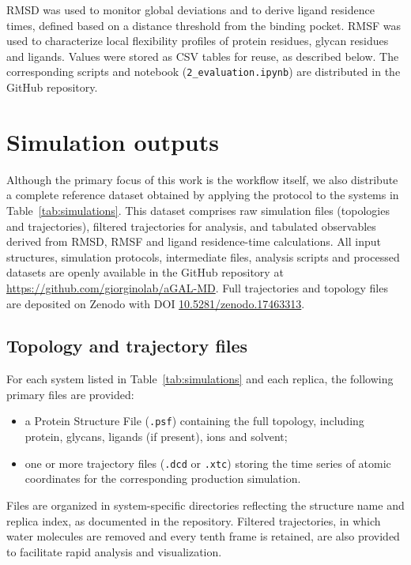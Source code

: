 \documentclass{article}
\begin{document}
RMSD was used to monitor global deviations and to derive ligand residence times, defined based on a distance threshold from the binding pocket.
RMSF was used to characterize local flexibility profiles of protein residues, glycan residues and ligands.
Values were stored as CSV tables for reuse, as described below.
The corresponding scripts and notebook (\verb+2_evaluation.ipynb+) are distributed in the GitHub repository.

\section{Simulation outputs}

Although the primary focus of this work is the workflow itself, we also distribute a complete reference dataset obtained by applying the protocol to the systems in Table~\ref{tab:simulations}.
This dataset comprises raw simulation files (topologies and trajectories), filtered trajectories for analysis, and tabulated observables derived from RMSD, RMSF and ligand residence-time calculations.
All input structures, simulation protocols, intermediate files, analysis scripts and processed datasets are openly available in the GitHub repository at \url{https://github.com/giorginolab/aGAL-MD}.
Full trajectories and topology files are deposited on Zenodo with DOI \url{10.5281/zenodo.17463313}.

\subsection{Topology and trajectory files}

For each system listed in Table~\ref{tab:simulations} and each replica, the following primary files are provided:
\begin{itemize}
    \item a Protein Structure File (\verb+.psf+) containing the full topology, including protein, glycans, ligands (if present), ions and solvent;
    \item one or more trajectory files (\verb+.dcd+ or \verb+.xtc+) storing the time series of atomic coordinates for the corresponding production simulation.
\end{itemize}

Files are organized in system-specific directories reflecting the structure name and replica index, as documented in the repository.
Filtered trajectories, in which water molecules are removed and every tenth frame is retained, are also provided to facilitate rapid analysis and visualization.
\end{document}
